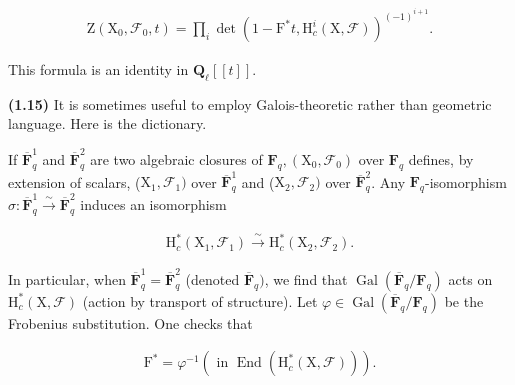 \documentclass[10pt,leqno]{article}
\begin{document}
\begin{equation*}\begin{gathered}\mathrm{Z}(\mathrm{X}_{0},\mathcal{F} _{0},t) = \prod _{i} \operatorname{det}(1- \mathrm{F}^{*}t,\mathrm{H}_{c}^{i}(\mathrm{X},\mathcal{F} ))^{(- 1)^{i+1}}.\end{gathered}\tag{1.14.3}\end{equation*}

\noindent This formula is an identity in \(\mathbf{Q}_{\ell }[[t]]\).\par

\noindent \textbf{(1.15)} It is sometimes useful to employ Galois-theoretic rather than geometric language. Here is the dictionary.\par

\noindent If \(\overline{\mathbf{F}}_{q}^{1}\) and \(\overline{\mathbf{F}}_{q}^{2}\) are two algebraic closures of \(\mathbf{F}_{q}, (\mathrm{X}_{0},\mathcal{F} _{0})\) over \(\mathbf{F}_{q}\) defines, by extension of scalars, (\(\mathrm{X}_{1},\mathcal{F} _{1})\) over \(\overline{\mathbf{F}}_{q}^{1}\) and (\(\mathrm{X}_{2},\mathcal{F} _{2})\) over \(\overline{\mathbf{F}}_{q}^{2}\). Any \(\mathbf{F}_{q}\)-isomorphism \(\sigma  : \overline{\mathbf{F}}_{q}^{1} \xrightarrow{\sim } \overline{\mathbf{F}}_{q}^{2}\) induces an isomorphism\par

\begin{equation*}\begin{gathered}\mathrm{H}_{c}^{*}(\mathrm{X}_{1},\mathcal{F} _{1}) \xrightarrow{\sim } \mathrm{H}_{c}^{*}(\mathrm{X}_{2},\mathcal{F} _{2}).\end{gathered}\end{equation*}

\noindent In particular, when \(\overline{\mathbf{F}}_{q}^{1}=\overline{\mathbf{F}}_{q}^{2}\) (denoted \(\overline{\mathbf{F}}_{q})\), we find that \(\operatorname{Gal}(\overline{\mathbf{F}}_{q}/\mathbf{F}_{q})\) acts on \(\mathrm{H}_{c}^{*}(\mathrm{X},\mathcal{F} )\) (action by transport of structure). Let \(\varphi \in \operatorname{Gal}(\overline{\mathbf{F}}_{q}/\mathbf{F}_{q})\) be the Frobenius substitution. One checks that\par

\begin{equation*}\begin{gathered}\mathrm{F}^{*} = \varphi ^{- 1}    (\text{ in }\operatorname{End}(\mathrm{H}_{c}^{*}(\mathrm{X},\mathcal{F} ))).\end{gathered}\end{equation*}
\end{document}
